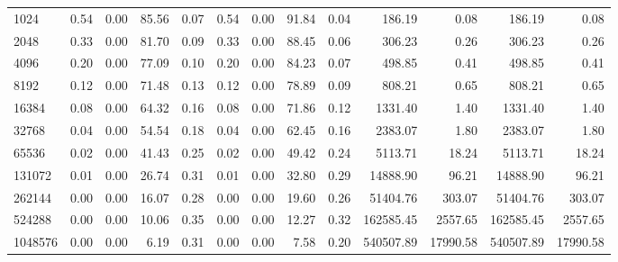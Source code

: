 \begin{tabular}{lrrrrrrrrrrrr}
1024     &        0.54 &        0.00 &         85.56 &          0.07 &           0.54 &           0.00 &        91.84 &         0.04 &           186.19 &             0.08 &          186.19 &            0.08 \\
2048     &        0.33 &        0.00 &         81.70 &          0.09 &           0.33 &           0.00 &        88.45 &         0.06 &           306.23 &             0.26 &          306.23 &            0.26 \\
4096     &        0.20 &        0.00 &         77.09 &          0.10 &           0.20 &           0.00 &        84.23 &         0.07 &           498.85 &             0.41 &          498.85 &            0.41 \\
8192     &        0.12 &        0.00 &         71.48 &          0.13 &           0.12 &           0.00 &        78.89 &         0.09 &           808.21 &             0.65 &          808.21 &            0.65 \\
16384    &        0.08 &        0.00 &         64.32 &          0.16 &           0.08 &           0.00 &        71.86 &         0.12 &          1331.40 &             1.40 &         1331.40 &            1.40 \\
32768    &        0.04 &        0.00 &         54.54 &          0.18 &           0.04 &           0.00 &        62.45 &         0.16 &          2383.07 &             1.80 &         2383.07 &            1.80 \\
65536    &        0.02 &        0.00 &         41.43 &          0.25 &           0.02 &           0.00 &        49.42 &         0.24 &          5113.71 &            18.24 &         5113.71 &           18.24 \\
131072   &        0.01 &        0.00 &         26.74 &          0.31 &           0.01 &           0.00 &        32.80 &         0.29 &         14888.90 &            96.21 &        14888.90 &           96.21 \\
262144   &        0.00 &        0.00 &         16.07 &          0.28 &           0.00 &           0.00 &        19.60 &         0.26 &         51404.76 &           303.07 &        51404.76 &          303.07 \\
524288   &        0.00 &        0.00 &         10.06 &          0.35 &           0.00 &           0.00 &        12.27 &         0.32 &        162585.45 &          2557.65 &       162585.45 &         2557.65 \\
1048576  &        0.00 &        0.00 &          6.19 &          0.31 &           0.00 &           0.00 &         7.58 &         0.20 &        540507.89 &         17990.58 &       540507.89 &        17990.58 \\

\end{tabular}
